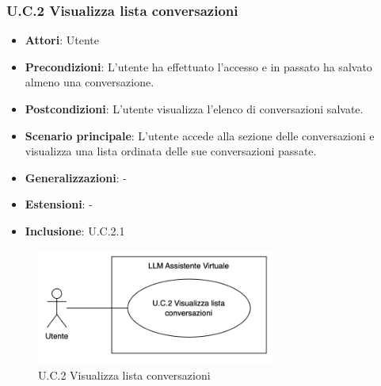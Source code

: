 \subsubsection{U.C.2 Visualizza lista conversazioni}
\begin{itemize}
    \item \textbf{Attori}: Utente
    \item \textbf{Precondizioni}: L'utente ha effettuato l'accesso e in passato ha salvato almeno una conversazione.
    \item \textbf{Postcondizioni}: L'utente visualizza l'elenco di conversazioni salvate.
    \item \textbf{Scenario principale}: L'utente accede alla sezione delle conversazioni e visualizza una lista ordinata delle sue conversazioni passate.
    \item \textbf{Generalizzazioni}: -
    \item \textbf{Estensioni}: -
    \item \textbf{Inclusione}: U.C.2.1
\end{itemize}
\begin{figure}[H]
    \centering
    \includegraphics[width=0.7\textwidth]{img/UC.2.png}
    \caption{U.C.2 Visualizza lista conversazioni}
\end{figure}
\newpage

